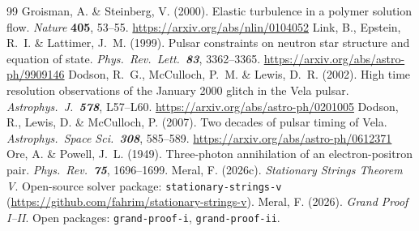 \documentclass[12pt,a4paper]{article}
\begin{document}
\begin{thebibliography}{99}
     Groisman, A. \& Steinberg, V. (2000). Elastic turbulence in
    a polymer solution flow. \textit{Nature} \textbf{405}, 53--55.
    \url{https://arxiv.org/abs/nlin/0104052}
     Link, B., Epstein, R.~I. \& Lattimer, J.~M. (1999).
    Pulsar constraints on neutron star structure and equation of state.
    \textit{Phys.\ Rev.\ Lett.\ \textbf{83}}, 3362--3365.
    \url{https://arxiv.org/abs/astro-ph/9909146}
     Dodson, R.~G., McCulloch, P.~M. \& Lewis, D.~R. (2002).
    High time resolution observations of the January 2000 glitch in the Vela
    pulsar. \textit{Astrophys.\ J.\ \textbf{578}}, L57--L60.
    \url{https://arxiv.org/abs/astro-ph/0201005}
     Dodson, R., Lewis, D. \& McCulloch, P. (2007). Two decades
    of pulsar timing of Vela. \textit{Astrophys.\ Space Sci.\ \textbf{308}}, 585--589.
    \url{https://arxiv.org/abs/astro-ph/0612371}
     Ore, A. \& Powell, J.~L. (1949). Three-photon annihilation
    of an electron-positron pair. \textit{Phys.\ Rev.\ \textbf{75}}, 1696--1699.
     Meral, F. (2026c). \textit{Stationary Strings Theorem V}.
    Open-source solver package: \texttt{stationary-strings-v}
    (\url{https://github.com/fahrim/stationary-strings-v}).
     Meral, F. (2026). \textit{Grand Proof I--II}.
    Open packages: \texttt{grand-proof-i}, \texttt{grand-proof-ii}.
\end{thebibliography}
\end{document}

